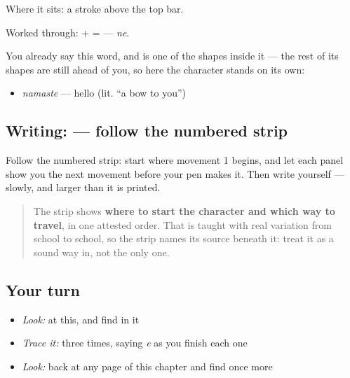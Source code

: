 Where it sits: a stroke above the top bar.

Worked through: \textbf{} + \textbf{} = \textbf{} — \emph{ne}.

You already say this word, and  is one of the shapes inside it — the rest of its shapes are still ahead of you, so here the character stands on its own:

\begin{itemize}
\raggedright
  \item \emph{namaste} — hello (lit. \textquotedblleft{}a bow to you\textquotedblright{})
\end{itemize}

\subsection*{Writing:  — follow the numbered strip}

Follow the numbered strip: start where movement 1 begins, and let each panel show you the next movement before your pen makes it. Then write  yourself — slowly, and larger than it is printed.

\begin{quote}
The strip shows \textbf{where to start the character and which way to travel}, in one attested order. That is taught with real variation from school to school, so the strip names its source beneath it: treat it as a sound way in, not the only one.
\end{quote}

\subsection*{Your turn}
\begin{itemize}
\raggedright
  \item \emph{Look:} at this, and find  in it
\end{itemize}

\begin{quote}
\end{quote}

\begin{itemize}
\raggedright
  \item \emph{Trace it:}  three times, saying \emph{e} as you finish each one
  \item \emph{Look:} back at any page of this chapter and find  once more
\end{itemize}

